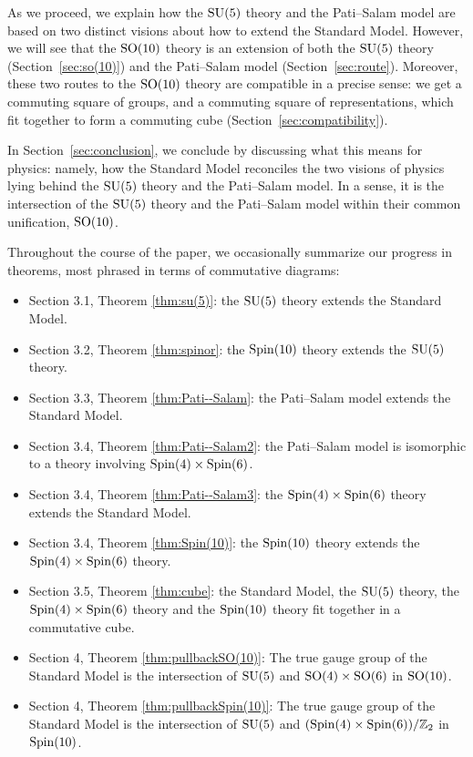 \documentclass[12pt]{article}
\newcommand{\SO}{{\rm SO}}    %
\newcommand{\SU}{{\rm SU}}    %
\newcommand{\Spin}{{\rm Spin}}    %
\begin{document}
As we proceed, we explain how the $\SU(5)$ theory and the Pati--Salam
model are based on two distinct visions about how to extend the
Standard Model.  However, we will see that the $\SO(10)$ theory is an
extension of both the $\SU(5)$ theory (Section~\ref{sec:so(10)}) and
the Pati--Salam model (Section~\ref{sec:route}). Moreover, these two
routes to the $\SO(10)$ theory are compatible in a precise sense: we
get a commuting square of groups, and a commuting square of
representations, which fit together to form a commuting cube
(Section~\ref{sec:compatibility}).

In Section~\ref{sec:conclusion}, we conclude by discussing what this
means for physics: namely, how the Standard Model reconciles the 
two visions of physics lying behind the
$\SU(5)$ theory and the Pati--Salam model.  In a sense, it is the
intersection of the $\SU(5)$ theory and the Pati--Salam model within
their common unification, $\SO(10)$.

Throughout the course of the paper, we occasionally summarize our 
progress in theorems, most phrased in terms of commutative
diagrams:

\begin{itemize}
\item Section 3.1, Theorem \ref{thm:su(5)}: the $\SU(5)$ theory extends the
Standard Model.
\item Section 3.2, Theorem \ref{thm:spinor}: the $\Spin(10)$ theory extends
the $\SU(5)$ theory.
\item Section 3.3, Theorem \ref{thm:Pati--Salam}: the Pati--Salam model 
extends the Standard Model.
\item Section 3.4, Theorem \ref{thm:Pati--Salam2}: the Pati--Salam model 
is isomorphic to a theory involving $\Spin(4) \times \Spin(6)$.
\item Section 3.4, Theorem \ref{thm:Pati--Salam3}: the $\Spin(4) \times 
\Spin(6)$ theory extends the Standard Model.
\item Section 3.4, Theorem \ref{thm:Spin(10)}: the $\Spin(10)$ theory extends
the $\Spin(4) \times \Spin(6)$ theory.
\item Section 3.5, Theorem \ref{thm:cube}: the Standard Model, the $\SU(5)$
theory, the $\Spin(4) \times \Spin(6)$ theory and the $\Spin(10)$
theory fit together in a commutative cube.
\item Section 4, Theorem \ref{thm:pullbackSO(10)}: The true gauge group of
the Standard Model is the intersection of $\SU(5)$ and $\SO(4) \times
\SO(6)$ in $\SO(10)$.
\item Section 4, Theorem \ref{thm:pullbackSpin(10)}: The true gauge group of
the Standard Model is the intersection of $\SU(5)$ and $(\Spin(4) \times
\Spin(6))/\mathbb{Z}_2$ in $\Spin(10)$.
\end{itemize}
\end{document}
